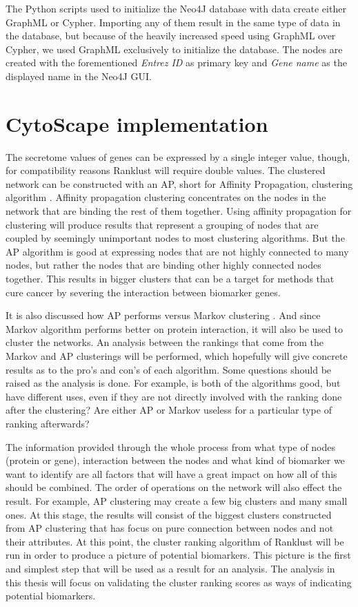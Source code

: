 The Python scripts used to initialize the Neo4J database with data create either
GraphML or Cypher. Importing any of them result in the same type of data in the
database, but because of the heavily increased speed using GraphML over Cypher,
we used GraphML exclusively to initialize the database. The nodes are created
with the forementioned \textit{Entrez ID} as primary key and \textit{Gene name}
as the displayed name in the Neo4J GUI.

\chapter{CytoScape implementation}
The secretome values of genes can be expressed by a single integer value,
though, for compatibility reasons Ranklust will require double values. The
clustered network can be constructed with an AP, short for Affinity Propagation,
clustering algorithm \cite{affinity-propagation}. Affinity propagation
clustering concentrates on the nodes in the network that are binding the rest of
them together. Using affinity propagation for clustering will produce results
that represent a grouping of nodes that are coupled by seemingly unimportant
nodes to most clustering algorithms. But the AP algorithm is good at expressing
nodes that are not highly connected to many nodes, but rather the nodes that are
binding other highly connected nodes together. This results in bigger clusters
that can be a target for methods that cure cancer by severing the interaction
between biomarker genes.

It is also discussed how AP performs versus Markov clustering \cite{ap-vs-mcl}.
And since Markov algorithm performs better on protein interaction, it will also
be used to cluster the networks. An analysis between the rankings that come from
the Markov and AP clusterings will be performed, which hopefully will give
concrete results as to the pro's and con's of each algorithm. Some questions
should be raised as the analysis is done. For example, is both of the algorithms
good, but have different uses, even if they are not directly involved with the
ranking done after the clustering?  Are either AP or Markov useless for
a particular type of ranking afterwards?

The information provided through the whole process from what type of nodes
(protein or gene), interaction between the nodes and what kind of biomarker we
want to identify are all factors that will have a great impact on how all of
this should be combined. The order of operations on the network will also effect
the result. For example, AP clustering may create a few big clusters and many
small ones. At this stage, the results will consist of the biggest clusters
constructed from AP clustering that has focus on pure connection between nodes
and not their attributes. At this point, the cluster ranking algorithm of
Ranklust will be run in order to produce a picture of potential biomarkers. This
picture is the first and simplest step that will be used as a result for an
analysis. The analysis in this thesis will focus on validating the cluster
ranking scores as ways of indicating potential biomarkers. 


